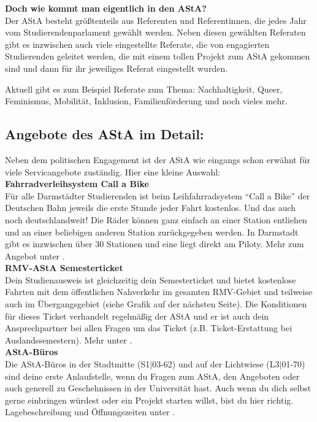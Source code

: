 {\noindent\textbf{Doch wie kommt man eigentlich in den AStA?}\\
Der AStA besteht größtenteils aus Referenten und Referentinnen, die jedes Jahr vom Studierendenparlament gewählt werden. Neben diesen gewählten Referaten gibt es inzwischen auch viele eingestellte Referate, die von engagierten Studierenden geleitet werden, die mit einem tollen Projekt zum AStA gekommen sind und dann für ihr jeweiliges Referat eingestellt wurden.

Aktuell gibt es zum Beispiel Referate zum Thema: Nachhaltigkeit, Queer, Feminismus, Mobilität, Inklusion, Familienförderung und noch vieles mehr.\\
\columnbreak

\subsection*{Angebote des AStA im Detail:}

Neben dem politischen Engagement ist der AStA wie eingangs schon erwähnt für viele Servicangebote zuständig. Hier eine kleine Auswahl:\\

\noindent\textbf{Fahrradverleihsystem Call a Bike}\\
Für alle Darmstädter Studierenden ist beim Leihfahrradsystem "`Call a Bike"' der Deutschen Bahn jeweils die erste Stunde jeder Fahrt kostenlos. Und das auch noch deutschlandweit! Die Räder können ganz einfach an einer Station entliehen und an einer beliebigen anderen Station zurückgegeben werden. In Darmstadt gibt es inzwischen über 30 Stationen und eine liegt direkt am Piloty. Mehr zum Angebot unter \footnotemark[1].\\

\noindent\textbf{RMV-AStA Semesterticket}\\
Dein Studienausweis ist gleichzeitig dein Semesterticket und bietet kostenlose Fahrten mit dem öffentlichen Nahverkehr im gesamten RMV-Gebiet und teilweise auch im Übergangsgebiet (siehe Grafik auf der nächsten Seite). Die Konditionen für dieses Ticket verhandelt regelmäßig der AStA und er ist auch dein Ansprechpartner bei allen Fragen um das Ticket (z.B. Ticket-Erstattung bei Auslandssemestern). Mehr unter \footnotemark[2].\\

\noindent\textbf{AStA-Büros}\\
Die AStA-Büros in der Stadtmitte (S1$|$03-62) und auf der Lichtwiese (L3$|$01-70) sind deine erste Anlaufstelle, wenn du Fragen zum AStA, den Angeboten oder auch generell zu Geschehnissen in der Universität hast. Auch wenn du dich selbst gerne einbringen würdest oder ein Projekt starten willst, bist du hier richtig. Lagebeschreibung und Öffnungszeiten unter \footnotemark[3].\\

}
